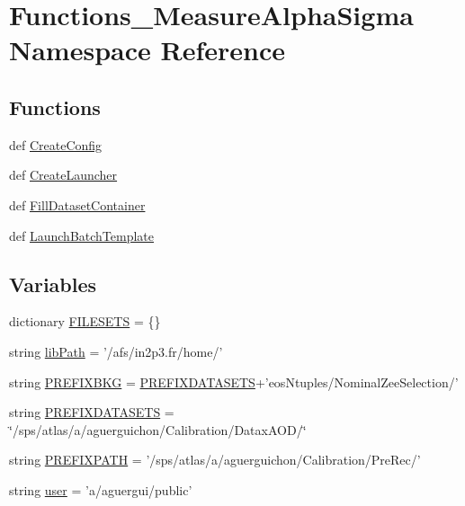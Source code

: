 \hypertarget{namespaceFunctions__MeasureAlphaSigma}{\section{Functions\+\_\+\+Measure\+Alpha\+Sigma Namespace Reference}
\label{namespaceFunctions__MeasureAlphaSigma}
}
\subsection*{Functions}
\begin{DoxyCompactItemize}
\item 
def \hyperlink{namespaceFunctions__MeasureAlphaSigma_a5ca199823decf5d413745ed4215513ef}{Create\+Config}
\item 
def \hyperlink{namespaceFunctions__MeasureAlphaSigma_abb7aa99f16630a9b3c57581d6e3e6c0e}{Create\+Launcher}
\item 
def \hyperlink{namespaceFunctions__MeasureAlphaSigma_af02b87ac0724ae724185b01764abfc36}{Fill\+Dataset\+Container}
\item 
def \hyperlink{namespaceFunctions__MeasureAlphaSigma_af49595b895cf39dc10e31440eff33ae4}{Launch\+Batch\+Template}
\end{DoxyCompactItemize}
\subsection*{Variables}
\begin{DoxyCompactItemize}
\item 
dictionary \hyperlink{namespaceFunctions__MeasureAlphaSigma_a13a3e320ea220c3b0e2da150d1964864}{F\+I\+L\+E\+S\+E\+T\+S} = \{\}
\item 
string \hyperlink{namespaceFunctions__MeasureAlphaSigma_a52886eac29193d86f31de45c05c23819}{lib\+Path} = '/afs/in2p3.\+fr/home/'
\item 
string \hyperlink{namespaceFunctions__MeasureAlphaSigma_a24db293caed1f3053a9e7d32ee0a34a7}{P\+R\+E\+F\+I\+X\+B\+K\+G} = \hyperlink{namespaceFunctions__MeasureAlphaSigma_a5e1f9170b324cbacbbb417d9b0b107e8}{P\+R\+E\+F\+I\+X\+D\+A\+T\+A\+S\+E\+T\+S}+'eos\+Ntuples/Nominal\+Zee\+Selection/'
\item 
string \hyperlink{namespaceFunctions__MeasureAlphaSigma_a5e1f9170b324cbacbbb417d9b0b107e8}{P\+R\+E\+F\+I\+X\+D\+A\+T\+A\+S\+E\+T\+S} = \char`\"{}/sps/atlas/a/aguerguichon/Calibration/Datax\+A\+O\+D/\char`\"{}
\item 
string \hyperlink{namespaceFunctions__MeasureAlphaSigma_ab5043c5c7e364338a5fc23d704a6d918}{P\+R\+E\+F\+I\+X\+P\+A\+T\+H} = '/sps/atlas/a/aguerguichon/Calibration/Pre\+Rec/'
\item 
string \hyperlink{namespaceFunctions__MeasureAlphaSigma_ae315dc7095b2ab26df1efb90a58f6345}{user} = 'a/aguergui/public'
\end{DoxyCompactItemize}



